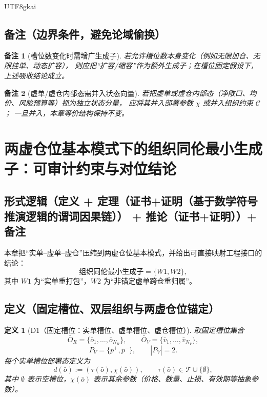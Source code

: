 \documentclass[12pt]{article}
\newtheorem{definition}{定义}[section]
\newtheorem{remark}{备注}[section]
\begin{document}
\begin{CJK*}{UTF8}{gkai}
\subsection{备注（边界条件，避免论域偷换）}
\label{subsec:tex28-ch18-remarks}

\begin{remark}[槽位数变化时需增广生成子]
若允许槽位数本身变化（例如无限加仓、无限挂单、动态扩容），
则应把“扩容/缩容”作为额外生成子；在槽位固定假设下，上述吸收结论成立。
\end{remark}

\begin{remark}[虚单/虚仓内部态需并入状态向量]
若把虚单或虚仓内部态（净敞口、均价、风险预算等）视为独立状态分量，
应将其并入部署参数 $\chi$ 或并入组织约束 $\mathcal C$；
一旦并入，本章等价结构保持不变。
\end{remark}

\section{两虚仓位基本模式下的组织同伦最小生成子：可审计约束与对位结论}
\label{sec:tex28-ch19}

\subsection{形式逻辑（定义 + 定理（证书+证明（基于数学符号推演逻辑的谓词因果链）） + 推论（证书+证明））+ 备注}
\label{subsec:tex28-ch19-logic}
本章把“实单--虚单--虚仓”压缩到两虚仓位基本模式，并给出可直接映射工程接口的结论：
\[
  \text{组织同伦最小生成子}
  =
  \{W1,W2\},
\]
其中 $W1$ 为“实单重打包”，$W2$ 为“非锚定虚单跨仓重归属”。

\subsection{定义（固定槽位、双层组织与两虚仓位锚定）}
\label{subsec:tex28-ch19-defs}

\begin{definition}[D1（固定槽位：实单槽位、虚单槽位、虚仓槽位）]
\label{def:tex28-ch19-d1}
取固定槽位集合
\[
  \bar O_R=\{\bar o_1,\dots,\bar o_{N_R}\},
  \qquad
  \bar O_V=\{\bar v_1,\dots,\bar v_{N_V}\},
\]
\[
  \bar P_V=\{\bar p^+,\bar p^-\},
  \qquad
  |\bar P_V|=2.
\]
每个实单槽位部署态定义为
\[
  d(\bar o):=(\tau(\bar o),\chi(\bar o)),
  \qquad
  \tau(\bar o)\in\mathcal T\cup\{\emptyset\},
\]
其中 $\emptyset$ 表示空槽位，$\chi(\bar o)$ 表示其余参数（价格、数量、止损、有效期等抽象参数）。
\end{definition}


\end{CJK*}
\end{document}
